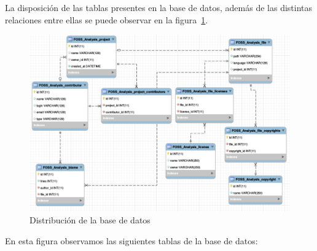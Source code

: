 \documentclass[a4paper, spanish, 12pt]{book}
\begin{document}
La disposici\'on de las tablas presentes en la base de datos, adem\'as de las
distintas relaciones entre ellas se puede observar en la figura~\ref{fig:database}.

\begin{figure}
  \centering
  \includegraphics[width=14cm, keepaspectratio]{img/mysql_tables}
  \caption{Distribuci\'on de la base de datos}
  \label{fig:database}
\end{figure}

En esta figura observamos las siguientes tablas de la base de datos:
\end{document}
